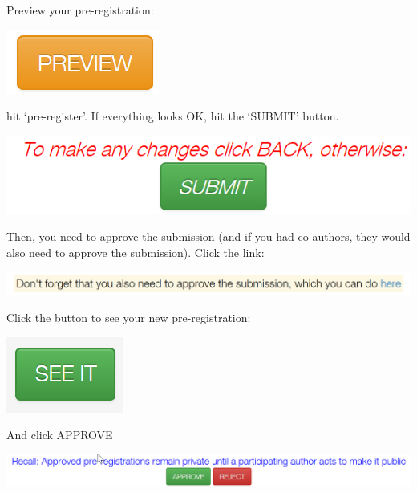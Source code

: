\documentclass[
  oneside]{book}
\begin{document}
Preview your pre-registration:

\begin{center}\includegraphics[width=0.2\linewidth]{images/4fbbec922f482e27aef0dd7f0714afad} \end{center}

hit `pre-register'. If everything looks OK, hit the `SUBMIT' button.

\begin{center}\includegraphics[width=1\linewidth]{images/7aa826d5b815c5aa18b66cfb6bcd30fe} \end{center}

Then, you need to approve the submission (and if you had co-authors, they would
also need to approve the submission). Click the link:

\begin{center}\includegraphics[width=1\linewidth]{images/c7691954684e51c29afa2aead98414c5} \end{center}

Click the button to see your new pre-registration:

\begin{center}\includegraphics[width=0.2\linewidth]{images/5623f5d1b8144f8cdc09d955eaf4a3b7} \end{center}

And click APPROVE

\begin{center}\includegraphics[width=1\linewidth]{images/6c3b919ae37f5dfed14761209592f337} \end{center}
\end{document}
